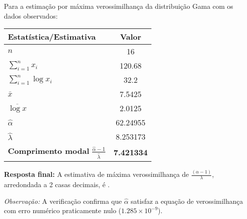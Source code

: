 \documentclass[11pt,a4paper]{article}
\begin{document}
\begin{tcolorbox}[colback=green!5!white,colframe=green!75!black,title=Solução]
Para a estimação por máxima verossimilhança da distribuição Gama com os dados observados:

\begin{center}
\begin{tabular}{|l|c|}
\hline
\textbf{Estatística/Estimativa} & \textbf{Valor} \\
\hline
\( n \) & 16 \\
\( \sum_{i=1}^n x_i \) & 120.68 \\
\( \sum_{i=1}^n \log x_i \) & 32.2 \\
\( \bar{x} \) & 7.5425 \\
\( \overline{\log x} \) & 2.0125 \\
\hline
\( \hat{\alpha} \) & 62.24955 \\
\( \hat{\lambda} \) & 8.253173 \\
\hline
\textbf{Comprimento modal} \( \frac{\hat{\alpha} - 1}{\hat{\lambda}} \) & \textbf{7.421334} \\
\hline
\end{tabular}
\end{center}

\vspace{0.5cm}
\textbf{Resposta final:} A estimativa de máxima verossimilhança de \( \frac{(\alpha - 1)}{\lambda} \), arredondada a 2 casas decimais, é .

\vspace{0.3cm}
\textit{Observação:} A verificação confirma que \( \hat{\alpha} \) satisfaz a equação de verossimilhança com erro numérico praticamente nulo (\(1.285 \times 10^{-9}\)).
\end{tcolorbox}
\end{document}
